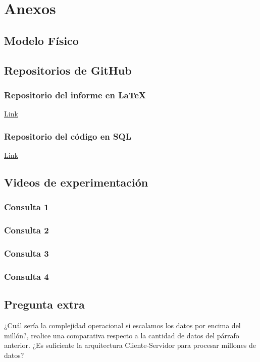 \section{Anexos}
\subsection{Modelo Físico}
\subsection{Repositorios de GitHub}
\subsubsection{Repositorio del informe en LaTeX}{
    \href{https://github.com/AlejandroEN/Database-I-Project-LaTex}{Link}
}
\subsubsection{Repositorio del código en SQL}{
    \href{https://github.com/AlejandroEN/Database-I-Project-Code}{Link}
}
\subsection{Videos de experimentación}
\subsubsection{Consulta 1}
\subsubsection{Consulta 2}
\subsubsection{Consulta 3}
\subsubsection{Consulta 4}
\subsection{Pregunta extra}
¿Cuál sería la complejidad operacional si escalamos los datos por encima del millón?, realice una comparativa respecto a la cantidad de datos del párrafo anterior. ¿Es suficiente la arquitectura Cliente-Servidor para procesar millones de datos?